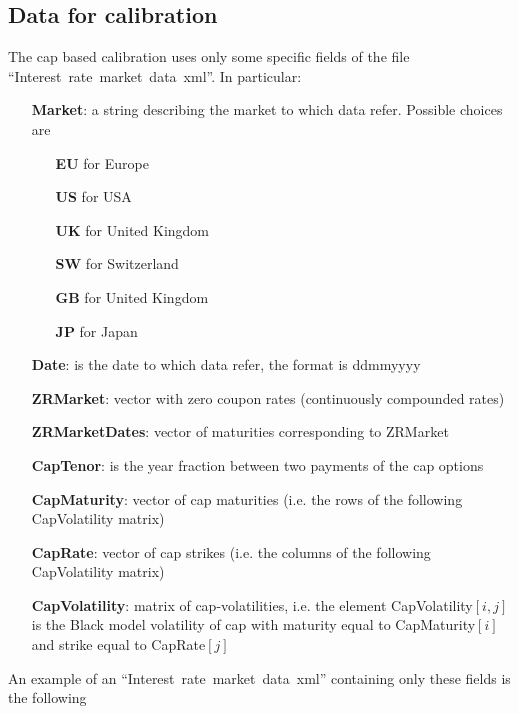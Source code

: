 \subsection{Data for calibration}
The cap based calibration uses only some specific fields of the file ``Interest~rate~market~data~xml''. In particular:
\begin{itemize}
\item[\textbf{Market}:] a string describing the market to which data refer. Possible choices are
	\begin{itemize}
	\item[\textbf{EU}] for Europe
    \item[\textbf{US}] for USA
    \item[\textbf{UK}] for United Kingdom
    \item[\textbf{SW}] for Switzerland
    \item[\textbf{GB}] for United Kingdom
    \item[\textbf{JP}] for Japan
	\end{itemize}
\item[\textbf{Date}:] is the date to which data refer, the format is ddmmyyyy
\item[\textbf{ZRMarket}:] vector with zero coupon rates (continuously compounded rates)
\item[\textbf{ZRMarketDates}:] vector of maturities corresponding to ZRMarket
\item[\textbf{CapTenor}:] is the year fraction between two payments of the cap options
\item[\textbf{CapMaturity}:] vector of cap maturities (i.e. the rows of the following CapVolatility matrix)
\item[\textbf{CapRate}:] vector of cap strikes (i.e. the columns of the following CapVolatility matrix)
\item[\textbf{CapVolatility}:] matrix of cap-volatilities, i.e. the element CapVolatility$[ i , j ]$ is the Black model volatility of cap with maturity equal to CapMaturity$[ i ]$ and strike equal to CapRate$[ j ]$
\end{itemize}
An example of an ``Interest~rate~market~data~xml'' containing only these fields is the following
